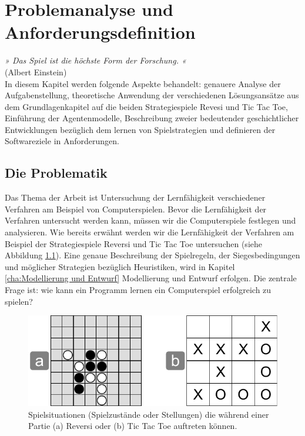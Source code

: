 \chapter{Problemanalyse und Anforderungsdefinition}
\label{cha:pua}

\emph{» Das Spiel ist die höchste Form der Forschung. «} \\
(Albert Einstein) \\

In diesem Kapitel werden folgende Aspekte behandelt: genauere Analyse der Aufgabenstellung, theoretische Anwendung der verschiedenen Lösungsansätze aus dem Grundlagenkapitel auf die beiden Strategiespiele Revesi und Tic Tac Toe, Einführung der Agentenmodelle, Beschreibung zweier bedeutender geschichtlicher Entwicklungen bezüglich dem lernen von Spielstrategien und definieren der Softwareziele in Anforderungen.

\section{Die Problematik}
Das Thema der Arbeit ist Untersuchung der Lernfähigkeit verschiedener Verfahren am Beispiel von Computerspielen. Bevor die Lernfähigkeit der Verfahren untersucht werden kann, müssen wir die Computerspiele festlegen und analysieren. Wie bereits erwähnt werden wir die Lernfähigkeit der Verfahren am Beispiel der Strategiespiele Reversi und Tic Tac Toe untersuchen (siehe Abbildung \ref{fig:reversi_und_tictactoe}). Eine genaue Beschreibung der Spielregeln, der Siegesbedingungen und möglicher Strategien bezüglich Heuristiken, wird in Kapitel \ref{cha:Modellierung und Entwurf} Modellierung und Entwurf erfolgen. Die zentrale Frage ist: wie kann ein Programm lernen ein Computerspiel erfolgreich zu spielen? \\

\begin{figure}[!htbp]
  \centering
  \includegraphics[scale = 0.8]{inhalt/abbildungen/reversi_und_tictactoe.pdf}
  \caption{Spielsituationen (Spielzustände oder Stellungen) die während einer Partie (a) Reversi oder (b) Tic Tac Toe auftreten können.}
  \label{fig:reversi_und_tictactoe}
\end{figure} 

